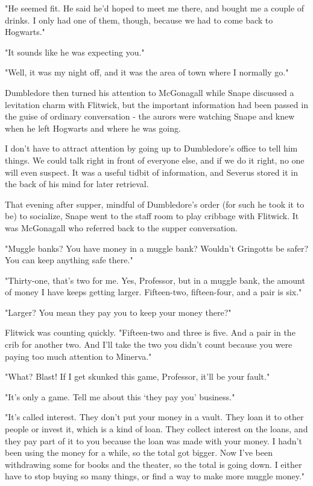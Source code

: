 "He seemed fit. He said he'd hoped to meet me there, and bought me a couple of drinks. I only had one of them, though, because we had to come back to Hogwarts."

"It sounds like he was expecting you."

"Well, it was my night off, and it was the area of town where I normally go."

Dumbledore then turned his attention to McGonagall while Snape discussed a levitation charm with Flitwick, but the important information had been passed in the guise of ordinary conversation - the aurors were watching Snape and knew when he left Hogwarts and where he was going.

I don't have to attract attention by going up to Dumbledore's office to tell him things. We could talk right in front of everyone else, and if we do it right, no one will even suspect. It was a useful tidbit of information, and Severus stored it in the back of his mind for later retrieval.

That evening after supper, mindful of Dumbledore's order (for such he took it to be) to socialize, Snape went to the staff room to play cribbage with Flitwick. It was McGonagall who referred back to the supper conversation.

"Muggle banks? You have money in a muggle bank? Wouldn't Gringotts be safer? You can keep anything safe there."

"Thirty-one, that's two for me. Yes, Professor, but in a muggle bank, the amount of money I have keeps getting larger. Fifteen-two, fifteen-four, and a pair is six."

"Larger? You mean they pay you to keep your money there?"

Flitwick was counting quickly. "Fifteen-two and three is five. And a pair in the crib for another two. And{\el} I'll take the two you didn't count because you were paying too much attention to Minerva."

"What? Blast! If I get skunked this game, Professor, it'll be your fault."

"It's only a game. Tell me about this `they pay you' business."

"It's called interest. They don't put your money in a vault. They loan it to other people or invest it, which is a kind of loan. They collect interest on the loans, and they pay part of it to you because the loan was made with your money. I hadn't been using the money for a while, so the total got bigger. Now I've been withdrawing some for books and the theater, so the total is going down. I either have to stop buying so many things, or find a way to make more muggle money."

